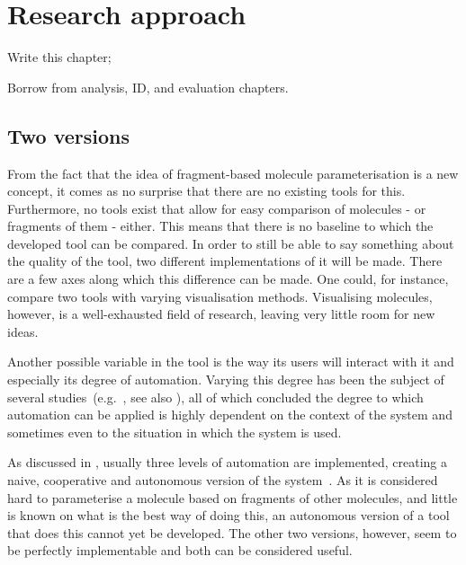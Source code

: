 \chapter{Research approach}

\begin{todo}
\item Write this chapter;
\item Borrow from analysis, ID, and evaluation chapters.
\end{todo}

\nlipsum



\section{Two versions}
From the fact that the idea of fragment-based molecule parameterisation is a new concept, it comes as no surprise that there are no existing tools for this. Furthermore, no tools exist that allow for easy comparison of molecules - or fragments of them - either. This means that there is no baseline to which the developed tool can be compared. In order to still be able to say something about the quality of the tool, two different implementations of it will be made. There are a few axes along which this difference can be made. One could, for instance, compare two tools with varying visualisation methods. Visualising molecules, however, is a well-exhausted field of research, leaving very little room for new ideas.

Another possible variable in the tool is the way its users will interact with it and especially its degree of automation. Varying this degree has been the subject of several studies~(e.g.~\cite{payne2000varying, horvitz1999principles, marcus1987taking, norman1990problem}, see also ), all of which concluded the degree to which automation can be applied is highly dependent on the context of the system and sometimes even to the situation in which the system is used.

As discussed in , usually three levels of automation are implemented, creating a naive, cooperative and autonomous version of the system~\cite{payne2000varying}. As it is considered hard to parameterise a molecule based on fragments of other molecules, and little is known on what is the best way of doing this, an autonomous version of a tool that does this cannot yet be developed. The other two versions, however, seem to be perfectly implementable and both can be considered useful.



